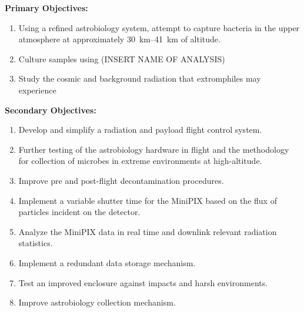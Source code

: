 {\bf Primary Objectives:}
	\begin{enumerate}
	\item Using a refined astrobiology system, attempt to capture bacteria in the upper atmosphere at approximately \SIrange{30}{41}{\kilo\meter} of altitude.
%	
%
	\item Culture samples using (INSERT NAME OF ANALYSIS)
	\item Study the cosmic and background radiation that extromphiles may experience
	\end{enumerate}
%
%
{\bf Secondary Objectives:}
	\begin{enumerate}
	\item Develop and simplify a radiation and payload flight control system.
	\item Further testing of the astrobiology hardware in flight and the methodology for collection of microbes in extreme environments at high-altitude. 
	\item Improve pre and post-flight decontamination procedures.
	\item Implement a variable shutter time for the MiniPIX based on the flux of particles incident on the detector.
	\item Analyze the MiniPIX data in real time and downlink relevant radiation statistics.
	\item Implement a redundant data storage mechanism.
	\item Test an improved enclosure against impacts and harsh environments.
	\item Improve astrobiology collection mechanism.
	
	\end{enumerate}
